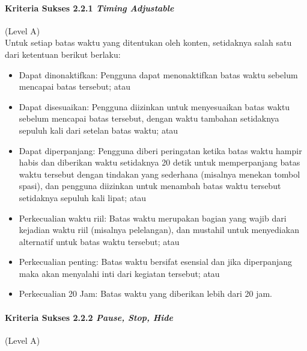 \paragraph{Kriteria Sukses 2.2.1 \textit{Timing Adjustable}}
\label{sec:kriteria_sukses_2.2.1}
(Level A)\\

Untuk setiap batas waktu yang ditentukan oleh konten, setidaknya salah satu dari ketentuan berikut berlaku:
\begin{itemize}
	\item Dapat dinonaktifkan: Pengguna dapat menonaktifkan batas waktu sebelum mencapai batas tersebut; atau
	\item Dapat disesuaikan: Pengguna diizinkan untuk menyesuaikan batas waktu sebelum mencapai batas tersebut, dengan waktu tambahan setidaknya sepuluh kali dari setelan batas waktu; atau
	\item Dapat diperpanjang: Pengguna diberi peringatan ketika batas waktu hampir habis dan diberikan waktu setidaknya 20 detik untuk memperpanjang batas waktu tersebut dengan tindakan yang sederhana (misalnya menekan tombol spasi), dan pengguna diizinkan untuk menambah batas waktu tersebut setidaknya sepuluh kali lipat; atau
	\item Perkecualian waktu riil: Batas waktu merupakan bagian yang wajib dari kejadian waktu riil (misalnya pelelangan), dan mustahil untuk menyediakan alternatif untuk batas waktu tersebut; atau
	\item Perkecualian penting: Batas waktu bersifat esensial dan jika diperpanjang maka akan menyalahi inti dari kegiatan tersebut; atau
	\item Perkecualian 20 Jam: Batas waktu yang diberikan lebih dari 20 jam.
\end{itemize}

\paragraph{Kriteria Sukses 2.2.2 \textit{Pause, Stop, Hide}}
\label{sec:kriteria_sukses_2.2.2}
(Level A)\\

